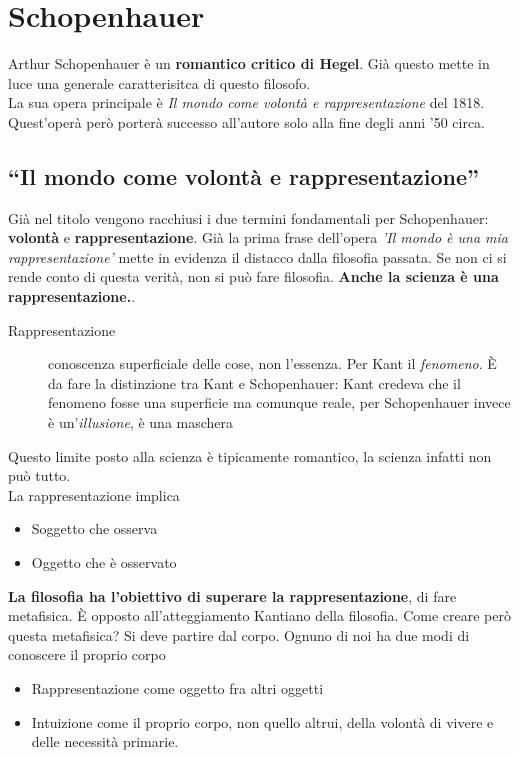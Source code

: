 
\section{Schopenhauer}

Arthur Schopenhauer è un \textbf{romantico critico di Hegel}. Già questo mette in luce una
generale caratterisitca di questo filosofo.\\
La sua opera principale è \textit{Il mondo come volontà e rappresentazione} del 1818. Quest'operà
però porterà successo all'autore solo alla fine degli anni '50 circa.

\subsection{``Il mondo come volontà e rappresentazione''}
Già nel titolo vengono racchiusi i due termini fondamentali per Schopenhauer: \textbf{volontà} e 
\textbf{rappresentazione}. Già la prima frase dell'opera \textit{'Il mondo è una mia 
rappresentazione'} mette in evidenza il distacco dalla filosofia passata. Se non ci si rende conto
di questa verità, non si può fare filosofia. \textbf{Anche la scienza è una rappresentazione.}.

\begin{description}
  \item[Rappresentazione] conoscenza superficiale delle cose, non l'essenza. Per Kant il 
    \textit{fenomeno}. È da fare la distinzione tra Kant e Schopenhauer: Kant credeva che il fenomeno
    fosse una superficie ma comunque reale, per Schopenhauer invece è un'\textit{illusione}, è una
    maschera
\end{description}

Questo limite posto alla scienza è tipicamente romantico, la scienza infatti non può tutto.\\
La rappresentazione implica
\begin{itemize}
  \item Soggetto che osserva
  \item Oggetto che è osservato
\end{itemize}
\textbf{La filosofia ha l'obiettivo di superare la rappresentazione}, di fare metafisica. È opposto
all'atteggiamento Kantiano della filosofia. Come creare però questa metafisica? Si deve partire dal
corpo. Ognuno di noi ha due modi di conoscere il proprio corpo
\begin{itemize}
  \item Rappresentazione come oggetto fra altri oggetti
  \item Intuizione come il proprio corpo, non quello altrui, della volontà di vivere e delle 
    necessità primarie.
\end{itemize}

